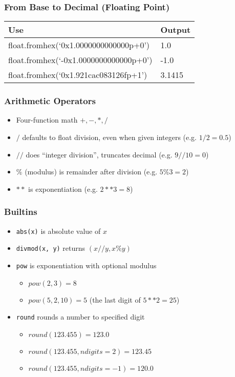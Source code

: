 \documentclass{beamer}
\begin{document}
\begin{frame}
  \frametitle{From Base to Decimal (Floating Point)}

  \begin{table}
    \begin{tabular}{l | l}
    Use          & Output   \\
    \hline
    float.fromhex(`0x1.0000000000000p+0')    &  1.0    \\
    float.fromhex(`-0x1.0000000000000p+0')   & -1.0    \\
    float.fromhex(`0x1.921cac083126fp+1')    &  3.1415 \\
    \end{tabular}
  \end{table}
\end{frame}

\begin{frame}
  \frametitle{Arithmetic Operators}

  \begin{itemize}
  \item Four-function math $+, -, *, /$
  \item $/$ defaults to float division, even when given integers (e.g. $1/2=0.5$)
  \item $//$ does ``integer division'', truncates decimal (e.g. $9//10=0$)
  \item $\%$ (modulus) is remainder after division (e.g. $5 \% 3 = 2$)
  \item $**$ is exponentiation (e.g. $2**3=8$)
  \end{itemize}
\end{frame}

\begin{frame}
  \frametitle{Builtins}

  \begin{itemize}
  \item \texttt{abs(x)} is absolute value of $x$
  \item \texttt{divmod(x, y)} returns $(x//y, x \% y)$
  \item \texttt{pow} is exponentiation with optional modulus
    \begin{itemize}
      \item $pow(2, 3) = 8$
      \item $pow(5, 2, 10) = 5$ (the last digit of $5**2=25$)
    \end{itemize}
  \item \texttt{round} rounds a number to specified digit
    \begin{itemize}
      \item $round(123.455) = 123.0$
      \item $round(123.455, ndigits=2) = 123.45$
      \item $round(123.455, ndigits=-1) = 120.0$
    \end{itemize}
  \end{itemize}
\end{frame}
\end{document}
